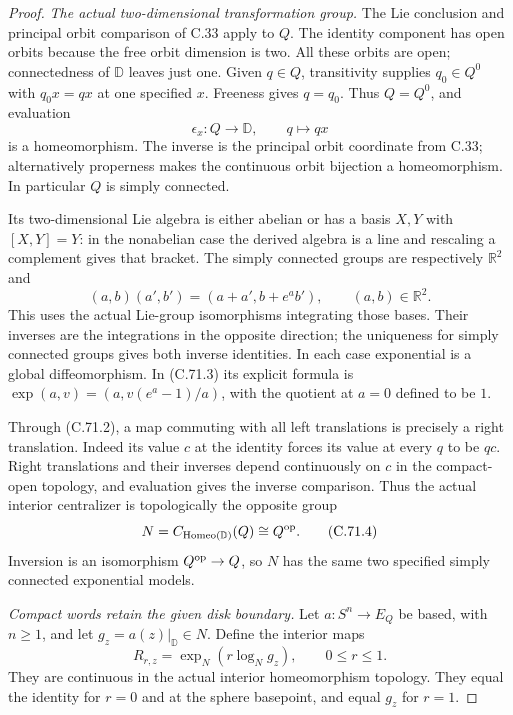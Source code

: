 \begin{proof}
\emph{The actual two-dimensional transformation group.}
The Lie conclusion and principal orbit comparison of C.33
apply to $Q$. The identity component has open orbits because
the free orbit dimension is two. All these orbits are open;
connectedness of $\mathbb D$ leaves just one. Given $q\in Q$,
transitivity supplies $q_0\in Q^0$ with $q_0x=qx$ at one
specified $x$. Freeness gives $q=q_0$. Thus $Q=Q^0$, and
evaluation
\[
                 \epsilon_x:Q\longrightarrow\mathbb D,
                       \qquad q\longmapsto qx
                                                               \tag{C.71.2}
\]
is a homeomorphism. The inverse is the principal orbit
coordinate from C.33; alternatively properness makes the
continuous orbit bijection a homeomorphism. In particular
$Q$ is simply connected.

Its two-dimensional Lie algebra is either abelian or has
a basis $X,Y$ with $[X,Y]=Y$: in the nonabelian case the
derived algebra is a line and rescaling a complement gives
that bracket. The simply connected groups are respectively
$\mathbb R^2$ and
\[
 (a,b)(a',b')=(a+a',b+e^a b'),
                   \qquad(a,b)\in\mathbb R^2 .
                                                               \tag{C.71.3}
\]
This uses the actual Lie-group isomorphisms integrating those
bases. Their inverses are the integrations in the opposite
direction; the uniqueness for simply connected groups gives
both inverse identities. In each case exponential is a
global diffeomorphism. In (C.71.3) its explicit formula is
$\exp(a,v)=(a,v(e^a-1)/a)$, with the quotient at $a=0$
defined to be $1$.

Through (C.71.2), a map commuting with all left translations
is precisely a right translation. Indeed its value $c$ at
the identity forces its value at every $q$ to be $qc$.
Right translations and their inverses depend continuously
on $c$ in the compact-open topology, and evaluation gives
the inverse comparison. Thus the actual interior centralizer
is topologically the opposite group
\[
 N=C_{\operatorname{Homeo}(\mathbb D)}(Q)\cong Q^{\rm op}.
                                                               \tag{C.71.4}
\]
Inversion is an isomorphism $Q^{\rm op}\to Q$, so $N$ has
the same two specified simply connected exponential models.

\emph{Compact words retain the given disk boundary.}
Let $a:S^n\to E_Q$ be based, with $n\geq1$, and let
$g_z=a(z)|_{\mathbb D}\in N$. Define the interior maps
\[
               R_{r,z}=\exp_N(r\log_N g_z),
                     \qquad 0\leq r\leq1 .
                                                               \tag{C.71.5}
\]
They are continuous in the actual interior homeomorphism
topology. They equal the identity for $r=0$ and at the
sphere basepoint, and equal $g_z$ for $r=1$.


\end{proof}

